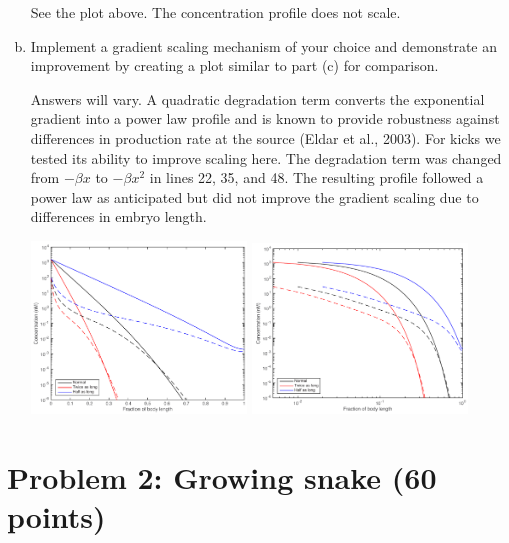 \documentclass{article}
\begin{document}
\begin{enumerate}[a)]
{\color{red}
See the plot above. The concentration profile does not scale.
}

\item Implement a gradient scaling mechanism of your choice and demonstrate an improvement by creating a plot similar to part (c) for comparison.\\

{\color{red}
Answers will vary. A quadratic degradation term converts the exponential gradient into a power law profile and is known to provide robustness against differences in production rate at the source (Eldar et al., 2003). For kicks we tested its ability to improve scaling here. The degradation term was changed from $-\beta x$ to $-\beta x^2$ in lines 22, 35, and 48. The resulting profile followed a power law as anticipated but did not improve the gradient scaling due to differences in embryo length.

\begin{center}
\includegraphics[width=0.45\textwidth]{prob1e.pdf} \hfill \includegraphics[width=0.45\textwidth]{prob1eloglog.pdf}
\end{center}


}

\end{enumerate}

\section*{Problem 2: Growing snake (60 points)}
\end{document}
